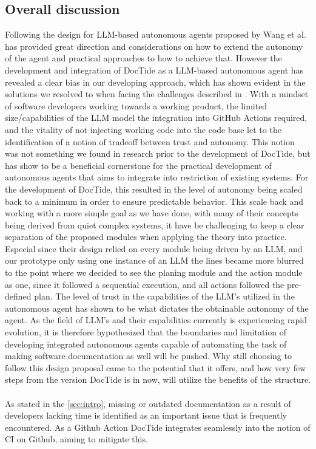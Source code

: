 \subsection{Overall discussion}
Following the design for LLM-based autonomous agents proposed by Wang et al.\cite{wang2024survey} has provided great direction and considerations on how to extend the autonomy of the agent and practical approaches to how to achieve that. However the development and integration of DocTide as a LLM-based autonomous agent has revealed a clear bias in our developing approach, which has shown evident in the solutions we resolved to when facing the challenges described in . With a mindset of software developers working towards a working product, the limited size/capabilities of the LLM model the integration into GitHub Actions required, and the vitality of not injecting working code into the code base let to the identification of a notion of tradeoff between trust and autonomy. This notion was not something we found in research prior to the development of DocTide, but has show to be a beneficial cornerstone for the practical development of autonomous agents that aims to integrate into restriction of existing systems. For the development of DocTide, this resulted in the level of autonomy being scaled back to a minimum in order to ensure predictable behavior. This scale back and working with a more simple goal as we have done, with many of their concepts being derived from quiet complex systems, it have be challenging to keep a clear separation of the proposed modules when applying the theory into practice. Especial since their design relied on every module being driven by an LLM, and our prototype only using one instance of an LLM the lines became more blurred to the point where we decided to see the planing module and the action module as one, since it followed a sequential execution, and all actions followed the pre-defined plan. The level of trust in the capabilities of the LLM's utilized in the autonomous agent has shown to be what dictates the obtainable autonomy of the agent. As the field of LLM's and their capabilities currently is experiencing rapid evolution, it is therefore hypothesized that the boundaries and limitation of developing integrated autonomous agents capable of automating the task of making software documentation as well will be pushed. Why still choosing to follow this design proposal came to the potential that it offers, and how very few steps from the version DocTide is in now, will utilize the benefits of the structure.
\\\\
As stated in the \cref{sec:intro}, missing or outdated documentation as a result of developers lacking time is identified as an important issue that is frequently encountered. As a Github Action DocTide integrates seamlessly into the notion of CI on Github, aiming to mitigate this.

